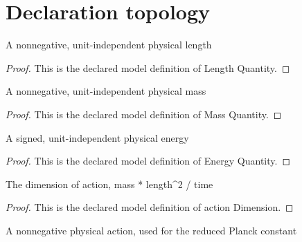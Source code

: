 \section{Declaration topology}
\begin{definition}
  \label{def:physics:phyx-mini-0520:phyxminiproblems-problemphyxmini0520-lengthquantity}
  A nonnegative, unit-independent physical length
\end{definition}
\begin{proof}
  This is the declared model definition of Length Quantity.
\end{proof}
\begin{definition}
  \label{def:physics:phyx-mini-0520:phyxminiproblems-problemphyxmini0520-massquantity}
  A nonnegative, unit-independent physical mass
\end{definition}
\begin{proof}
  This is the declared model definition of Mass Quantity.
\end{proof}
\begin{definition}
  \label{def:physics:phyx-mini-0520:phyxminiproblems-problemphyxmini0520-energyquantity}
  A signed, unit-independent physical energy
\end{definition}
\begin{proof}
  This is the declared model definition of Energy Quantity.
\end{proof}
\begin{definition}
  \label{def:physics:phyx-mini-0520:phyxminiproblems-problemphyxmini0520-actiondimension}
  The dimension of action, mass * length\textasciicircum{}2 / time
\end{definition}
\begin{proof}
  This is the declared model definition of action Dimension.
\end{proof}
\begin{definition}
  \label{def:physics:phyx-mini-0520:phyxminiproblems-problemphyxmini0520-actionquantity}
  A nonnegative physical action, used for the reduced Planck constant
\end{definition}
